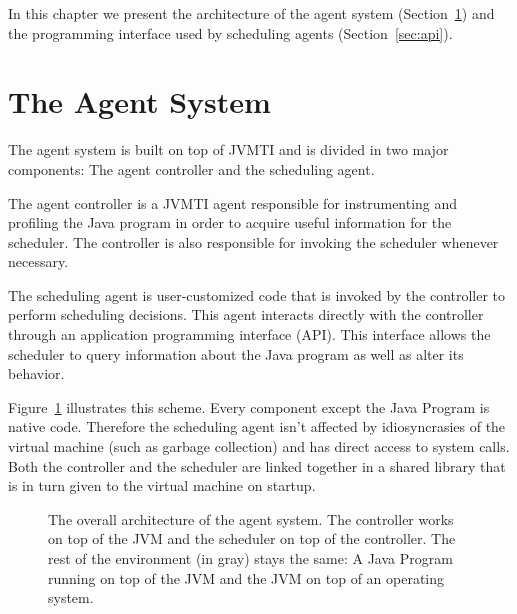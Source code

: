 
In this chapter we present the architecture of the agent system (Section~\ref{sec:agentsystem}) and the programming interface used by scheduling agents (Section~\ref{sec:api}).

\section{The Agent System} \label{sec:agentsystem}

The agent system is built on top of JVMTI and is divided in two major components: The agent controller and the scheduling agent.

The agent controller is a JVMTI agent responsible for instrumenting and profiling the Java program in order to acquire useful information for the scheduler. The controller is also responsible for invoking the scheduler whenever necessary.

The scheduling agent is user-customized code that is invoked by the controller to perform scheduling decisions. This agent interacts directly with the controller through an application programming interface (API). This interface allows the scheduler to query information about the Java program as well as alter its behavior.

Figure~\ref{fig:agentsystem} illustrates this scheme. Every component except the Java Program is native code. Therefore the scheduling agent isn't affected by idiosyncrasies of the virtual machine (such as garbage collection) and has direct access to system calls. Both the controller and the scheduler are linked together in a shared library that is in turn given to the virtual machine on startup.

\begin{figure} \label{fig:agentsystem}
\centering
{}
\caption{The overall architecture of the agent system. The controller works on top of the JVM and the scheduler on top of the controller. The rest of the environment (in gray) stays the same: A Java Program running on top of the JVM and the JVM on top of an operating system.}
\end{figure}

